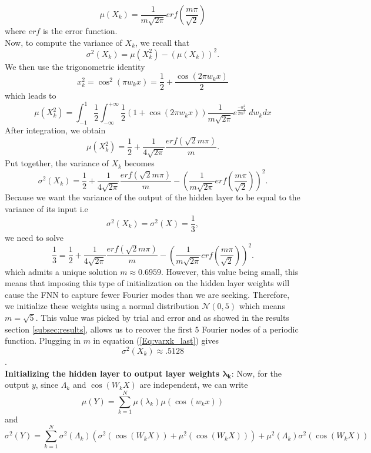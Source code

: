 \documentclass[AMS,STIX1COL]{WileyNJD-v2}
\begin{document}
\begin{equation}\label{Eq:muxk_last}
    \mu(X_k) = \frac{1}{m\sqrt{2\pi}}erf\left(\frac{m\pi}{\sqrt{2}}\right) 
\end{equation}
where $erf$ is the error function.\\
Now, to compute the variance of $X_k$, we recall that
$$\sigma^2(X_k) = \mu(X_k^2) - (\mu(X_k))^2.$$ 
We then use the trigonometric identity $$x_k^2 = \cos^2(\pi w_k x) = \frac{1}{2} + \frac{\cos(2\pi w_kx)}{2}$$ which leads to
\begin{equation*}
    \mu(X_k^2) = \int_{-1}^{1}\frac{1}{2} \int_{-\infty}^{+\infty} \frac{1}{2}(1 + \cos(2 \pi w_k x))\frac{1}{m \sqrt{2\pi}} e^{\frac{-w_k^2}{2m^2}}\; dw_k dx
\end{equation*}
After integration, we obtain 
$$\mu(X_k^2) = \frac{1}{2} + \frac{1}{4\sqrt{2\pi}}\frac{erf\left(\sqrt{2}m\pi\right)}{m}.$$
Put together, the variance of $X_k$ becomes
\begin{equation}\label{Eq:varxk_last}
    \sigma^2(X_k) = \frac{1}{2} + \frac{1}{4\sqrt{2\pi}}\frac{erf(\sqrt{2}m\pi)}{m}-\left(\frac{1}{m\sqrt{2\pi}}erf\left(\frac{m\pi}{\sqrt{2}}\right) \right)^2 .
\end{equation}
Because we want the variance of the output of the hidden layer to be equal to the variance of its input i.e $$\sigma^2(X_k) = \sigma^2(X) = \frac{1}{3}, $$ we need to solve 
\begin{equation*}
    \frac{1}{3} = \frac{1}{2} + \frac{1}{4\sqrt{2\pi}}\frac{erf(\sqrt{2}m\pi)}{m}-\left(\frac{1}{m\sqrt{2\pi}}erf\left(\frac{m\pi}{\sqrt{2}}\right) \right)^2 .
\end{equation*}
which admits a unique solution $m \approx 0.6959$. However, this value being small, this means that imposing this type of initialization on the hidden layer weights will cause the FNN to capture fewer Fourier modes than we are seeking. Therefore, we initialize these weights using a normal distribution $\mathcal N(0,5)$ which means $m = \sqrt{5}$. This value was picked by trial and error and as showed in the results section \ref{subsec:results}, allows us to recover the first 5 Fourier nodes of a periodic function. Plugging in $m$ in equation (\ref{Eq:varxk_last}) gives
$$\sigma^2(X_k) \approx .5128$$. \\
 \textbf{Initializing the hidden layer to output layer weights  $\mathbf{\lambda_k}$}: Now, for the output $y$, since $\Lambda_k$ and $\cos(W_k X)$ are independent, we can write $$\mu(Y) = \sum_{k = 1}^N \mu(\lambda_k) \mu(\cos(w_k x  ))$$ and $$\sigma^2(Y) = \sum_{k = 1}^N \sigma^2 (\Lambda_k)  \left(\sigma^2\left(\cos(W_k X)\right)+\mu^2\left(\cos(W_k X)\right) \right) +  \mu^2(\Lambda_k)\sigma^2\left(\cos(W_k X)\right)$$ 
\end{document}
